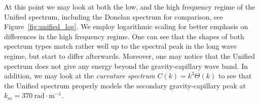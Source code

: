 At this point we may look at both the low, and the high frequency regime of the 
Unified spectrum, including the Donelan spectrum for comparison, see 
Figure~\ref{fig:unified_log}. We employ logarithmic scaling for better
emphasis on differences in the high frequency regime. One can see that the shapes
of both spectrum types match rather well up to the spectral peak in the long wave regime,
but start to differ afterwards. Moreover, one may notice that the Unified spectrum
does not give any energy beyond the gravity-capillary wave band. In addition, we may
look at the \emph{curvature spectrum} $C(k) = k^3\Theta(k)$ to see that the Unified 
spectrum properly models the secondary gravity-capillary peak at \wavenumber 
$k_m = 370~\text{rad}\cdot\text{m}^{-1}$.
%

\begin{figure}
 \centering
 \hfill
 \subtop[$U_{10}=\sqrt{8}$]
 {
}
\end{figure}
